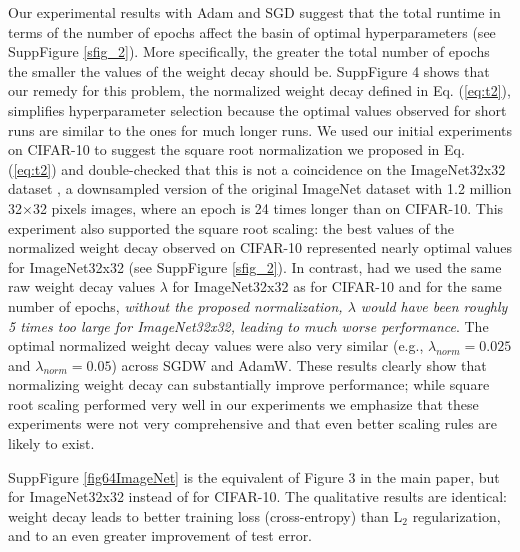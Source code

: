 \documentclass[usenames,dvipsnames]{article} %
\begin{document}
Our experimental results with Adam and SGD suggest that the total runtime in terms of the number of epochs affect the basin of optimal hyperparameters (see SuppFigure \ref{sfig_2}). 
More specifically, the greater the total number of epochs the smaller the values of the weight decay should be. 
SuppFigure 4
shows that our remedy for this problem, the normalized weight decay defined in Eq. (\ref{eq:t2}), simplifies hyperparameter selection because the optimal values observed for short runs are similar to the ones for much longer runs. 
We used our initial experiments on CIFAR-10 to suggest the square root normalization we proposed in Eq. (\ref{eq:t2}) and double-checked that this is not a coincidence on the ImageNet32x32 dataset \citep{chrabaszcz2017downsampled}, a downsampled version of the original ImageNet dataset with 1.2 million  32$\times$32 pixels images, where an epoch is 24 times longer than on CIFAR-10. This experiment also supported the square root scaling:  the best values of the normalized weight decay observed on CIFAR-10 represented nearly optimal values for ImageNet32x32 (see SuppFigure \ref{sfig_2}).
In contrast, had we used the same raw weight decay values $\lambda$ for ImageNet32x32 as for CIFAR-10 and for the same number of epochs, \emph{without the proposed normalization, $\lambda$ would have been roughly 5 times too large for ImageNet32x32, leading to much worse performance}. 
The optimal normalized weight decay values were also very similar (e.g., $\lambda_{norm} = 0.025$ and $\lambda_{norm} = 0.05$) across SGDW and AdamW.
These results clearly show that normalizing weight decay can substantially improve performance; while square root scaling performed very well in our experiments we emphasize that these experiments were not very comprehensive and that even better scaling rules are likely to exist. 


SuppFigure \ref{fig64ImageNet} is the equivalent of Figure 3 in the main paper, but for ImageNet32x32 instead of for CIFAR-10. The  qualitative results are identical: weight decay leads to better training loss (cross-entropy) than L$_2$ regularization, and to an even greater improvement of test error.
\end{document}
